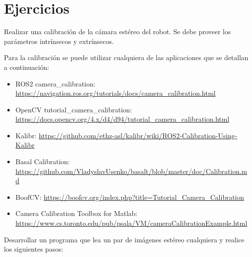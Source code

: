 \documentclass[tp]{lcc}
\begin{document}
\section{Ejercicios}

\ejercicio Realizar una calibración de la cámara estéreo del robot. Se debe proveer los parámetros intrínsecos y extrínsecos.

\begin{nota}
    Para la calibración se puede utilizar cualquiera de las aplicaciones que se detallan a continuación:
    \begin{itemize}
        \item ROS2 camera\_calibration:  \url{https://navigation.ros.org/tutorials/docs/camera_calibration.html}
        \item OpenCV tutorial\_camera\_calibration:\\ \url{https://docs.opencv.org/4.x/d4/d94/tutorial_camera_calibration.html}
        \item Kalibr: \url{https://github.com/ethz-asl/kalibr/wiki/ROS2-Calibration-Using-Kalibr}
        \item Basal Calibration: \url{https://github.com/VladyslavUsenko/basalt/blob/master/doc/Calibration.md}
        \item BoofCV: \url{https://boofcv.org/index.php?title=Tutorial_Camera_Calibration}
        \item Camera Calibration Toolbox for Matlab:\\ \url{https://www.cs.toronto.edu/pub/psala/VM/cameraCalibrationExample.html}
    \end{itemize}
\end{nota}

\ejercicio Desarrollar un programa que lea un par de imágenes estéreo cualquiera y realice los siguientes pasos:
\end{document}
